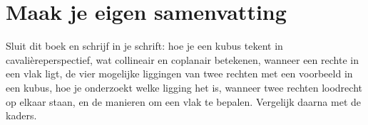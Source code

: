 \ifzelfstudie
\section*{Maak je eigen samenvatting}
Sluit dit boek en schrijf in je schrift: hoe je een kubus tekent in cavalièreperspectief, wat collineair en coplanair betekenen, wanneer een rechte in een vlak ligt, de vier mogelijke liggingen van twee rechten met een voorbeeld in een kubus, hoe je onderzoekt welke ligging het is, wanneer twee rechten loodrecht op elkaar staan, en de manieren om een vlak te bepalen. Vergelijk daarna met de kaders.
\fi
